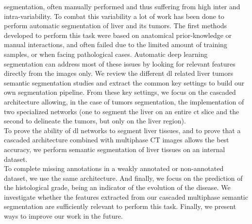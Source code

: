 segmentation, often manually performed and thus suffering from high
inter and intra-variability.
To combat this variability a lot of work has been done to perform
automatic segmentation of liver and its tumors.
The first methods developed to perform this task were based on
anatomical prior-knowledge or manual interactions, and often failed due to 
the limited amount of training samples, or when
facing pathological cases.
Automatic deep learning segmentation can address most of these issues by
looking for relevant features directly from the images only.
We review the different \ac{dl} related liver tumors semantic segmentation
studies and extract the common key settings to build our own segmentation pipeline.
From these key settings, we focus on the cascaded architecture allowing,
in the case of tumors segmentation, the implementation of two specialized
networks (one to segment the liver on an entire \ac{ct} slice and the second to delineate the
tumors, but only on the liver region).\\
To prove the ability of \ac{dl} networks to segment liver tissues, and to
prove that a cascaded architecture combined with multiphase CT images
allows the best accuracy, we perform semantic segmentation of liver
tissues on an internal dataset.\\
To complete missing annotations in a weakly annotated or non-annotated
dataset, we use the same architecture.
And finally, we focus on the prediction of the histological grade, being
an indicator of the evolution of the disease. We investigate whether the
features extracted from our cascaded multiphase semantic segmentation
are sufficiently relevant to perform this task. 
Finally, we present ways to improve our work in the future.
